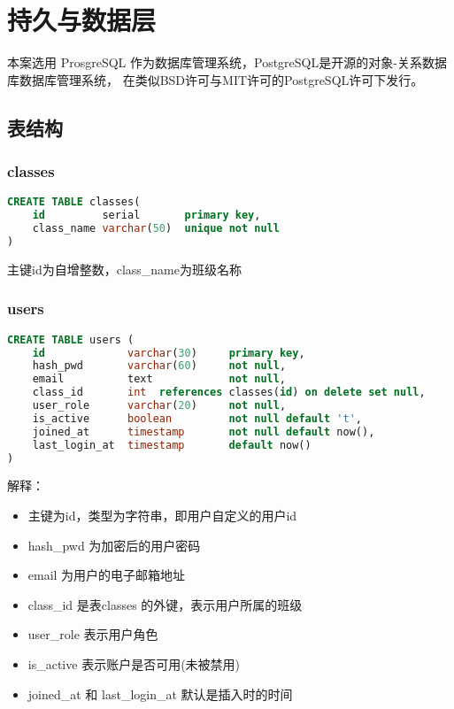 \section{持久与数据层}
本案选用 ProsgreSQL 作为数据库管理系统，PostgreSQL是开源的对象-关系数据库数据库管理系统，
在类似BSD许可与MIT许可的PostgreSQL许可下发行。

\subsection{表结构}
\subsubsection{classes}
\begin{lstlisting}[language = SQL]
CREATE TABLE classes(
    id         serial       primary key,
    class_name varchar(50)  unique not null
)
\end{lstlisting}
主键id为自增整数，class\_name为班级名称
\subsubsection{users}
\begin{lstlisting}[language = SQL]
CREATE TABLE users (
    id             varchar(30)     primary key,
    hash_pwd       varchar(60)     not null,
    email          text            not null,
    class_id       int  references classes(id) on delete set null,
    user_role      varchar(20)     not null,
    is_active      boolean         not null default 't',
    joined_at      timestamp       not null default now(),
    last_login_at  timestamp       default now()
)
\end{lstlisting}
解释：
\begin{itemize}
    \item 主键为id，类型为字符串，即用户自定义的用户id
    \item hash\_pwd 为加密后的用户密码
    \item email 为用户的电子邮箱地址
    \item class\_id 是表classes 的外键，表示用户所属的班级
    \item user\_role 表示用户角色
    \item is\_active 表示账户是否可用(未被禁用)
    \item joined\_at 和 last\_login\_at 默认是插入时的时间
\end{itemize}

